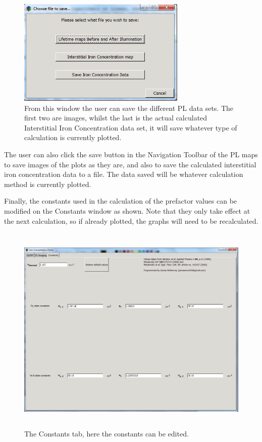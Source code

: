 \documentclass[final,a4paper,oneside,12pt]{article}
\begin{document}
\begin{figure}[h!]
\includegraphics[height=2in]{2whichsave}
\caption{\label{figure2} From this window the user can save the different PL data sets. The first two are images, whilst the last is the actual calculated Interstitial Iron Concentration data set, it will save whatever type of calculation is currently plotted.}
\end{figure}

The user can also click the save button in the Navigation Toolbar of the PL maps to save images of the plots as they are, and also to save the calculated interstitial iron concentration data to a file. The data saved will be whatever calculation method is currently plotted.
\\
\pagebreak

Finally, the constants used in the calculation of the prefactor values can be modified on the Constants window as shown. Note that they only take effect at the next calculation, so if already plotted, the graphs will need to be recalculated.

\begin{figure}[h!]
\includegraphics[height=4in]{2constants}
\caption{\label{figure3} The Constants tab, here the constants can be edited.}
\end{figure}
\end{document}
